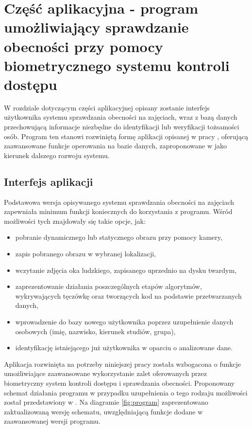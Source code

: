 \chapter{Część aplikacyjna - program umożliwiający sprawdzanie obecności przy pomocy biometrycznego systemu kontroli dostępu}
\label{cha:systemKontroli}

W rozdziale dotyczącym części aplikacyjnej opisany zostanie interfejs użytkownika systemu sprawdzania obecności na zajęciach, wraz z bazą danych przechowującą informacje niezbędne do identyfikacji lub weryfikacji tożsamości osób. Program ten stanowi rozwiniętą formę aplikacji opisanej w pracy \cite{Gl11}, oferującą zaawansowane funkcje operowania na bazie danych, zaproponowane w \cite{Gl11} jako kierunek dalszego rozwoju systemu.

\section{Interfejs aplikacji}
\label{sec:aplikacja}

Podstawowa wersja opisywanego systemu sprawdzania obecności na zajęciach zapewniała minimum funkcji koniecznych do korzystania z programu. Wśród możliwości tych znajdowały się takie opcje, jak:
\begin{itemize}
\item pobranie dynamicznego lub statycznego obrazu przy pomocy kamery,
\item zapis pobranego obrazu w wybranej lokalizacji,
\item wczytanie zdjęcia oka ludzkiego, zapisanego uprzednio na dysku twardym,
\item zaprezentowanie działania poszczególnych etapów algorytmów, wykrywających tęczówkę oraz tworzących kod na podstawie przetwarzanych danych,
\item wprowadzenie do bazy nowego użytkownika poprzez uzupełnienie danych osobowych (imię, nazwisko, kierunek studiów, grupa),
\item identyfikację istniejącego już użytkownika w oparciu o analizowane dane.
\end{itemize}

Aplikacja rozwinięta na potrzeby niniejszej pracy została wzbogacona o funkcje umożliwiające zaawansowane wykorzystanie zalet oferowanych przez biometryczny system kontroli dostępu i sprawdzania obecności. Proponowany schemat działania programu w przypadku uzupełnienia o tego rodzaju możliwości został przedstawiony w \cite{Gl11}. Na diagramie \ref{fig:program} zaprezentowano zaktualizowaną wersję schematu, uwzględniającą funkcje dodane w zaawansowanej wersji programu.



